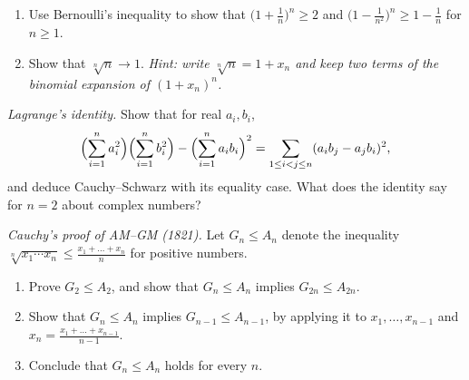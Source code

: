\begin{exercise}[$\star$]\label{ex:bernoulli}
\begin{enumerate}[label=(\alph*)]
\item Use Bernoulli's inequality to show that $\bigl(1+\frac1n\bigr)^n\ge2$ and $\bigl(1-\frac1{n^2}\bigr)^n\ge1-\frac1n$ for $n\ge1$.
\item Show that $\sqrt[n]n\to1$. \emph{Hint: write $\sqrt[n]n=1+x_n$ and keep two terms of the binomial expansion of $(1+x_n)^n$.}
\end{enumerate}
\end{exercise}

\begin{exercise}[$\star\star$]\label{ex:lagrangeid}
\emph{Lagrange's identity.} Show that for real $a_i,b_i$,
\[
\Bigl(\sum_{i=1}^na_i^2\Bigr)\Bigl(\sum_{i=1}^nb_i^2\Bigr)-\Bigl(\sum_{i=1}^na_ib_i\Bigr)^2=\sum_{1\le i<j\le n}(a_ib_j-a_jb_i)^2,
\]
and deduce Cauchy--Schwarz with its equality case. What does the identity say for $n=2$ about complex numbers?
\end{exercise}

\begin{exercise}[$\star\star$]\label{ex:cauchyinduction}
\emph{Cauchy's proof of AM--GM (1821).} Let $G_n\le A_n$ denote the inequality $\sqrt[n]{x_1\cdots x_n}\le\frac{x_1+\dots+x_n}n$ for positive numbers.
\begin{enumerate}[label=(\alph*)]
\item Prove $G_2\le A_2$, and show that $G_n\le A_n$ implies $G_{2n}\le A_{2n}$.
\item Show that $G_n\le A_n$ implies $G_{n-1}\le A_{n-1}$, by applying it to $x_1,\dots,x_{n-1}$ and $x_n=\frac{x_1+\dots+x_{n-1}}{n-1}$.
\item Conclude that $G_n\le A_n$ holds for every $n$.
\end{enumerate}
\end{exercise}

